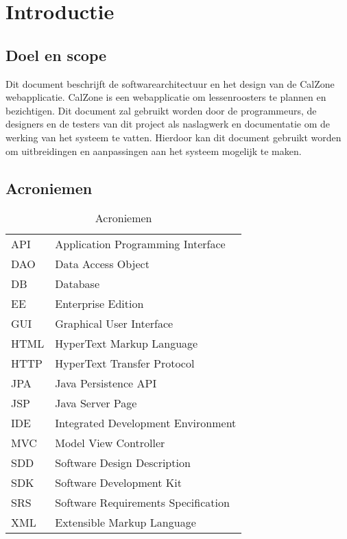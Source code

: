 \chapter{Introductie}

\section{Doel en scope}
Dit document beschrijft de softwarearchitectuur en het design van de CalZone webapplicatie.
CalZone is een webapplicatie om lessenroosters te plannen en bezichtigen.
Dit document zal gebruikt worden door de programmeurs, de designers en de testers van dit project als naslagwerk en documentatie om de werking van het systeem te vatten. 
Hierdoor kan dit document gebruikt worden om uitbreidingen en aanpassingen aan het systeem mogelijk te maken.


\section{Acroniemen}

\begin{table}[H]
	\centering
	\caption{Acroniemen}
	\label{tab:Acroniemen}
	\begin{tabular}{l | l}
	
	API	& Application Programming Interface\\
	
	DAO	& Data Access Object\\

	DB	& Database\\
	
	EE	& Enterprise Edition\\

	GUI	& Graphical User Interface\\
	
	HTML	& HyperText Markup Language\\
	
	HTTP	& HyperText Transfer Protocol\\
	
	JPA	& Java Persistence API\\

	JSP & Java Server Page\\
	
	IDE	& Integrated Development Environment\\

	MVC & Model View Controller\\ 

	SDD	& Software Design Description\\

	SDK	& Software Development Kit\\

	SRS	& Software Requirements Specification\\
	
	XML & Extensible Markup Language\\
	
	\end{tabular}
\end{table}


